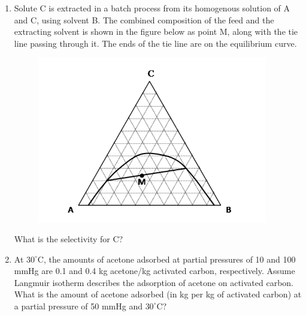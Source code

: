 \documentclass[journal,12pt,onecolumn]{IEEEtran}
\theoremstyle{remark}
\begin{document}
\begin{enumerate}
\item Solute C is extracted in a batch process from its homogenous solution of A and C, using solvent B. The combined composition of the feed and the extracting solvent is shown in the figure below as point M, along with the tie line passing through it. The ends of the tie line are on the equilibrium curve.
\begin{figure}[H]
    \centering
    \includegraphics[width=0.5\columnwidth]{figs/qn 44.jpg}
    \caption{}
    \label{fig:qn 54.jpg}
\end{figure}
What is the selectivity for C?
\hfill{}
\begin{enumerate}
\end{enumerate}
\item At $30^\circ\text{C}$, the amounts of acetone adsorbed at partial pressures of 10 and 100 mmHg are 0.1 and 0.4 kg acetone/kg activated carbon, respectively. Assume Langmuir isotherm describes the adsorption of acetone on activated carbon. What is the amount of acetone adsorbed (in kg per kg of activated carbon) at a partial pressure of 50 mmHg and $30^\circ\text{C}$?
\hfill{}
\begin{enumerate}
\end{enumerate}


\end{enumerate}
\end{document}
